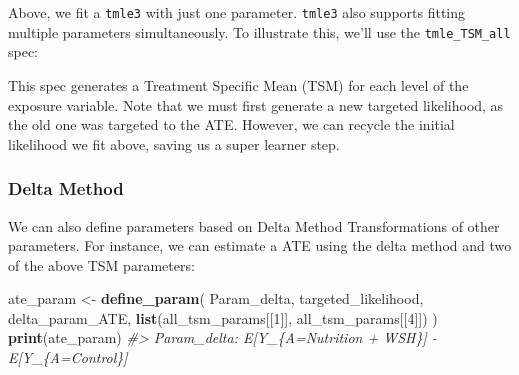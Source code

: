 \documentclass[12pt, krantz2,]{krantz}
\newenvironment{Shaded}{\begin{snugshade}}{\end{snugshade}}
\newcommand{\CommentTok}[1]{\textcolor[rgb]{0.37,0.37,0.37}{\textit{#1}}}
\newcommand{\DecValTok}[1]{\textcolor[rgb]{0.06,0.06,0.06}{#1}}
\newcommand{\KeywordTok}[1]{\textcolor[rgb]{0.27,0.27,0.27}{\textbf{#1}}}
\newcommand{\NormalTok}[1]{#1}
\newcommand{\OperatorTok}[1]{\textcolor[rgb]{0.43,0.43,0.43}{\textbf{#1}}}
\newcommand{\StringTok}[1]{\textcolor[rgb]{0.5,0.5,0.5}{#1}}
\theoremstyle{definition}
\theoremstyle{definition}
\theoremstyle{definition}
\newcommand{\1}{\mathbbm{1}}
\begin{document}
Above, we fit a \texttt{tmle3} with just one parameter. \texttt{tmle3} also supports fitting
multiple parameters simultaneously. To illustrate this, we'll use the
\texttt{tmle\_TSM\_all} spec:

\begin{Shaded}
\end{Shaded}

This spec generates a Treatment Specific Mean (TSM) for each level of the
exposure variable. Note that we must first generate a new targeted likelihood,
as the old one was targeted to the ATE. However, we can recycle the initial
likelihood we fit above, saving us a super learner step.

\hypertarget{delta-method}{%
\subsubsection{Delta Method}\label{delta-method}}

We can also define parameters based on Delta Method Transformations of other
parameters. For instance, we can estimate a ATE using the delta method and two
of the above TSM parameters:

\begin{Shaded}
\begin{Highlighting}[]
\NormalTok{ate_param <-}\StringTok{ }\KeywordTok{define_param}\NormalTok{(}
\NormalTok{  Param_delta, targeted_likelihood,}
\NormalTok{  delta_param_ATE,}
  \KeywordTok{list}\NormalTok{(all_tsm_params[[}\DecValTok{1}\NormalTok{]], all_tsm_params[[}\DecValTok{4}\NormalTok{]])}
\NormalTok{)}
\KeywordTok{print}\NormalTok{(ate_param)}
\CommentTok{#> Param_delta: E[Y_\{A=Nutrition + WSH\}] - E[Y_\{A=Control\}]}
\end{Highlighting}
\end{Shaded}
\end{document}
